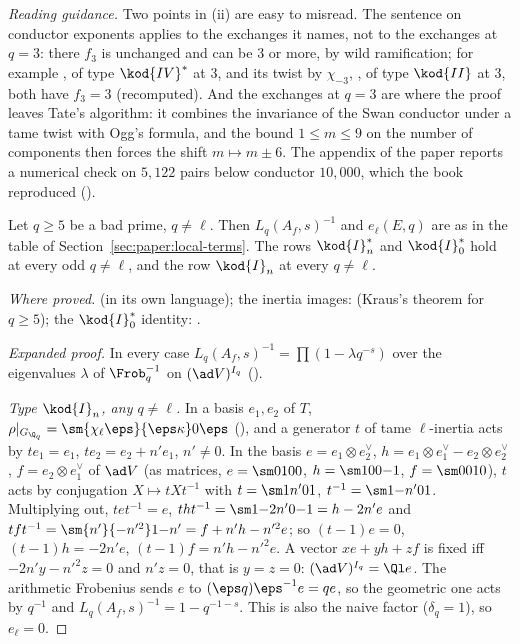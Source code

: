 \begin{sloppypar}
\noindent\emph{Reading guidance.} Two points in (ii) are easy to misread. The sentence on conductor exponents applies to the exchanges it names, not to the
exchanges at $q=3$: there $f_3$ is unchanged and can be $3$ or more, by wild ramification; for example , of type $\kod{IV}^*$ at $3$, and its twist by
$\chi_{-3}$, , of type $\kod{II}$ at $3$, both have $f_3=3$ (recomputed). And the exchanges at $q=3$ are where the proof leaves Tate's algorithm: it combines the
invariance of the Swan conductor under a tame twist with Ogg's formula, and the bound $1\le m\le9$ on the number of components then forces the shift $m\mapsto m\pm6$. The
appendix of the paper reports a numerical check on $5{,}122$ pairs below conductor $10{,}000$, which the book reproduced ().

\begin{lemma}\label{lem:paper:euler}
Let $q\ge5$ be a bad prime, $q\ne\ell$. Then $L_q(A_f,s)^{-1}$ and $e_\ell(E,q)$ are as in the table of Section~\ref{sec:paper:local-terms}. The rows $\kod{I}_n^*$ and $\kod{I}_0^*$ hold at every
odd $q\ne\ell$, and the row $\kod{I}_n$ at every $q\ne\ell$.
\end{lemma}

\noindent\emph{Where proved.}  (in its own language); the inertia images:  (Kraus's theorem \cite{Kraus90} for $q\ge5$); the $\kod{I}_0^*$ identity:
.

\begin{proof}[Expanded proof]
In every case $L_q(A_f,s)^{-1}=\prod(1-\lambda q^{-s})$ over the eigenvalues $\lambda$ of $\Frob_q^{-1}$ on $(\ad V)^{I_q}$ ().

\emph{Type $\kod{I}_n$, any $q\ne\ell$.} In a basis $e_1,e_2$ of $T$, $\rho|_{G_{\Q_q}}=\sm{\chi_\ell\eps}{\eps\kappa}0{\eps}$ (), and a generator $t$ of tame $\ell$-inertia acts by
$te_1=e_1$, $te_2=e_2+n'e_1$, $n'\ne0$. In the basis $e=e_1\otimes e_2^\vee$, $h=e_1\otimes e_1^\vee-e_2\otimes e_2^\vee$, $f=e_2\otimes e_1^\vee$ of $\ad V$ (as matrices, $e=\sm0100$, $h=\sm100{-1}$,
$f=\sm0010$), $t$ acts by conjugation $X\mapsto tXt^{-1}$ with $t=\sm1{n'}01$, $t^{-1}=\sm1{-n'}01$. Multiplying out, $tet^{-1}=e$, $tht^{-1}=\sm1{-2n'}0{-1}=h-2n'e$ and
$tft^{-1}=\sm{n'}{-n'^2}1{-n'}=f+n'h-n'^2e$; so $(t-1)e=0$, $(t-1)h=-2n'e$, $(t-1)f=n'h-n'^2e$. A vector $xe+yh+zf$ is fixed iff $-2n'y-n'^2z=0$ and $n'z=0$, that is $y=z=0$:
$(\ad V)^{I_q}=\Ql e$. The arithmetic Frobenius sends $e$ to $(\eps q)\eps^{-1}e=qe$, so the geometric one acts by $q^{-1}$ and $L_q(A_f,s)^{-1}=1-q^{-1-s}$.
This is also the naive factor ($\delta_q=1$), so $e_\ell=0$.


\end{proof}
\end{sloppypar}
